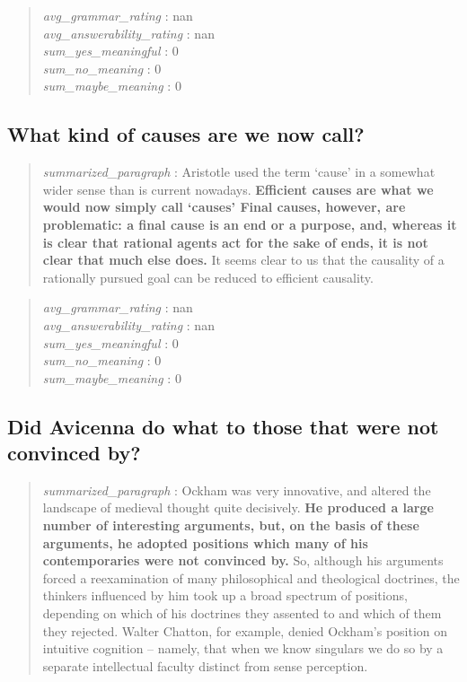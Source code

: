 \begin{quote}
\emph{avg\_grammar\_rating} : nan\\
\emph{avg\_answerability\_rating} : nan\\
\emph{sum\_yes\_meaningful} : 0\\
\emph{sum\_no\_meaning} : 0\\
\emph{sum\_maybe\_meaning} : 0
\end{quote}

\hypertarget{what-kind-of-causes-are-we-now-call}{%
\subsection{What kind of causes are we now
call?}\label{what-kind-of-causes-are-we-now-call}}

\begin{quote}
\emph{summarized\_paragraph} : Aristotle used the term `cause' in a
somewhat wider sense than is current nowadays. \textbf{Efficient causes
are what we would now simply call `causes' Final causes, however, are
problematic: a final cause is an end or a purpose, and, whereas it is
clear that rational agents act for the sake of ends, it is not clear
that much else does.} It seems clear to us that the causality of a
rationally pursued goal can be reduced to efficient causality.
\end{quote}

\begin{quote}
\emph{avg\_grammar\_rating} : nan\\
\emph{avg\_answerability\_rating} : nan\\
\emph{sum\_yes\_meaningful} : 0\\
\emph{sum\_no\_meaning} : 0\\
\emph{sum\_maybe\_meaning} : 0
\end{quote}

\hypertarget{did-avicenna-do-what-to-those-that-were-not-convinced-by}{%
\subsection{Did Avicenna do what to those that were not convinced
by?}\label{did-avicenna-do-what-to-those-that-were-not-convinced-by}}

\begin{quote}
\emph{summarized\_paragraph} : Ockham was very innovative, and altered
the landscape of medieval thought quite decisively. \textbf{He produced
a large number of interesting arguments, but, on the basis of these
arguments, he adopted positions which many of his contemporaries were
not convinced by.} So, although his arguments forced a reexamination of
many philosophical and theological doctrines, the thinkers influenced by
him took up a broad spectrum of positions, depending on which of his
doctrines they assented to and which of them they rejected. Walter
Chatton, for example, denied Ockham's position on intuitive cognition --
namely, that when we know singulars we do so by a separate intellectual
faculty distinct from sense perception.
\end{quote}

